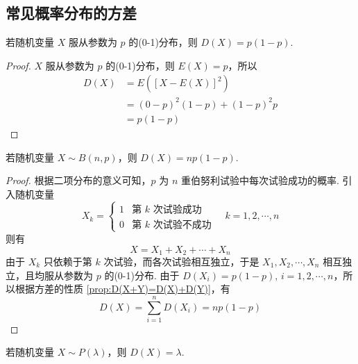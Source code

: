 \subsection{常见概率分布的方差}

\begin{conclusion}
    \indent 若随机变量 $X$ 服从参数为 $p$ 的(0-1)分布，则 $D(X) = p(1-p)$.
\end{conclusion}

\begin{proof}
    $X$ 服从参数为 $p$ 的(0-1)分布，则 $E(X)=p$，所以
    $$
    \begin{aligned}
        D(X) &= E([X-E(X)]^2) \\
        &= (0-p)^2 (1-p) + (1-p)^2 p \\
        &= p(1-p)
    \end{aligned}
    $$

    \vspace{-1.3em}
\end{proof}

\begin{conclusion}
    \indent 若随机变量 $X \sim B(n,p)$，则 $D(X) = np(1-p)$.
\end{conclusion}

\begin{proof}
    根据二项分布的意义可知，$p$ 为 $n$ 重伯努利试验中每次试验成功的概率. 引入随机变量
    $$
    X_k = \begin{cases}
        1 & \text{第 $k$ 次试验成功} \\
        0 & \text{第 $k$ 次试验不成功}
    \end{cases} \quad k=1,2,\cdots,n
    $$
    则有
    $$
    X = X_1 + X_2 + \cdots + X_n
    $$
    由于 $X_k$ 只依赖于第 $k$ 次试验，而各次试验相互独立，于是 $X_1, X_2, \cdots, X_n$ 相互独立，且均服从参数为 $p$ 的(0-1)分布. 由于 $D(X_i) = p(1-p), \, i=1,2,\cdots,n$，所以根据方差的性质 \ref{prop:D(X+Y)=D(X)+D(Y)}，有
    $$
    D(X) = \sum_{i=1}^n D(X_i) = np(1-p)
    $$
\end{proof}

\begin{conclusion}
    \indent 若随机变量 $X \sim P(\lambda)$，则 $D(X) = \lambda$.
\end{conclusion}

